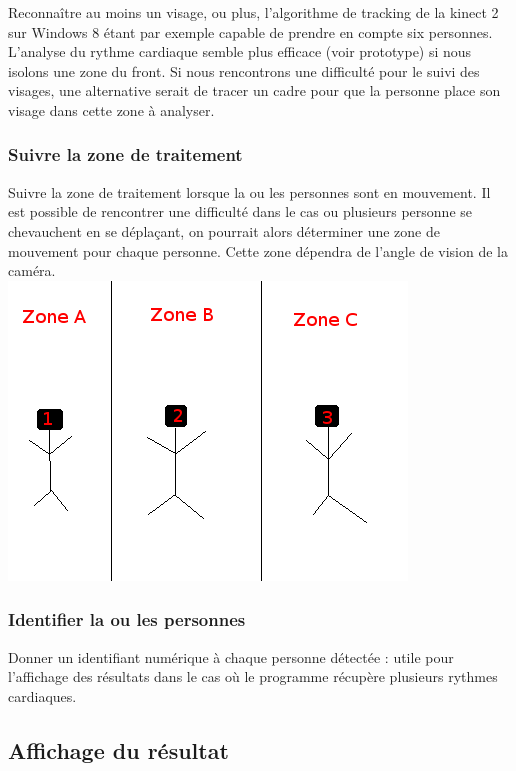 \documentclass[12pt,a4paper]{article}
\begin{document}
Reconnaître au moins un visage, ou plus, l'algorithme de tracking de la kinect 2 sur Windows 8 étant par exemple capable de prendre en compte six personnes.
L'analyse du rythme cardiaque semble plus efficace (voir prototype) si nous isolons une zone du front.
Si nous rencontrons une difficulté pour le suivi des visages, une alternative serait de tracer un cadre pour que la personne place son visage dans cette zone à analyser.

\subsubsection{Suivre la zone de traitement}

Suivre la zone de traitement lorsque la ou les personnes sont en mouvement. Il est possible de rencontrer une difficulté dans le cas ou plusieurs personne se   chevauchent en se déplaçant, on pourrait alors déterminer une zone de mouvement pour chaque personne. Cette zone dépendra de l'angle de vision de la caméra.\\

\includegraphics{zone_mouvement.png}

\subsubsection{Identifier la ou les personnes}

Donner un identifiant numérique à chaque personne détectée : utile pour l'affichage des résultats dans le cas où le programme récupère plusieurs rythmes cardiaques.


\subsection{Affichage du résultat}
\end{document}
